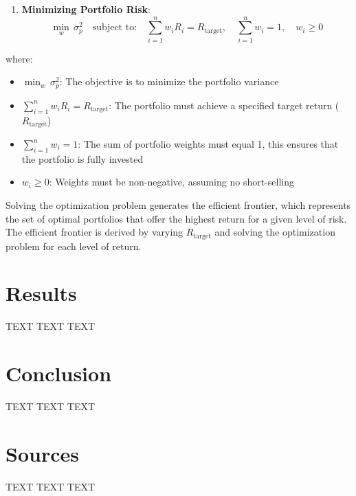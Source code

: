 \documentclass[
]{article}
\providecommand{\tightlist}{%
  \setlength{\itemsep}{0pt}\setlength{\parskip}{0pt}}
\begin{document}
\begin{enumerate}
\def\labelenumi{\arabic{enumi}.}
\setcounter{enumi}{2}
\tightlist
\item
  \textbf{Minimizing Portfolio Risk}: \[
  \min_{w} \, \sigma_p^2 \quad \text{subject to:} \quad \sum_{i=1}^{n} w_i R_i = R_{\text{target}}, \quad \sum_{i=1}^{n} w_i = 1, \quad w_i \geq 0
  \]
\end{enumerate}

where:

\begin{itemize}
\tightlist
\item
  \(\min_{w} \, \sigma_p^2\): The objective is to minimize the portfolio
  variance
\item
  \(\sum_{i=1}^{n} w_i R_i = R_{\text{target}}\): The portfolio must
  achieve a specified target return (\(R_{\text{target}}\))
\item
  \(\sum_{i=1}^{n} w_i = 1\): The sum of portfolio weights must equal 1,
  this ensures that the portfolio is fully invested
\item
  \(w_i \geq 0\): Weights must be non-negative, assuming no
  short-selling
\end{itemize}

Solving the optimization problem generates the efficient frontier, which
represents the set of optimal portfolios that offer the highest return
for a given level of risk. The efficient frontier is derived by varying
\(R_{\text{target}}\) and solving the optimization problem for each
level of return.

\section{Results}\label{results}

TEXT TEXT TEXT

\section{Conclusion}\label{conclusion}

TEXT TEXT TEXT

\pagebreak

\section{Sources}\label{sources}

TEXT TEXT TEXT
\end{document}
